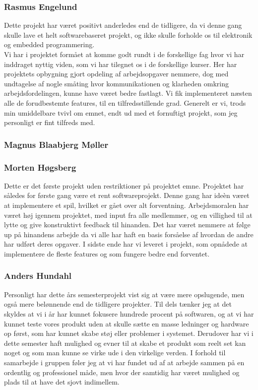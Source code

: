 \subsubsection{Rasmus Engelund}
Dette projekt har været positivt anderledes end de tidligere, da vi denne gang skulle lave et helt softwarebaseret projekt, og ikke skulle forholde os til elektronik og embedded programmering.\\
Vi har i projektet formået at komme godt rundt i de forskellige fag hvor vi har inddraget nyttig viden, som vi har tilegnet os i de forskellige kurser. Her har projektets opbygning gjort opdeling af arbejdsopgaver nemmere, dog med undtagelse af nogle småting hvor kommunikationen og klarheden omkring arbejdsfordelingen, kunne have været bedre fastlagt.
Vi fik implementeret næsten alle de forudbestemte features, til en tilfredsstillende grad.
Generelt er vi, trods min umiddelbare tvivl om emnet, endt ud med et fornuftigt projekt, som jeg personligt er fint tilfreds med. 

\subsubsection{Magnus Blaabjerg Møller}

\subsubsection{Morten Høgsberg}
Dette er det første projekt uden restriktioner på projektet emne. Projektet har således for første gang
være et rent softwareprojekt. Denne gang har ideèn været at implementere et spil, hvilket er gået over
alt forventning. Arbejdsmoralen har været høj igennem projektet, med input fra alle medlemmer, og en
villighed til at lytte og give konstruktivt feedback til hinanden.
Det har været nemmere at følge up på hinandens arbejde da vi alle har haft en basis forsåelse af hvordan 
de andre har udført deres opgaver. I sidste ende har vi leveret i projekt, som opnådede at implementere
de fleste features og som fungere bedre end forventet. 

\subsubsection{Anders Hundahl}
Personligt har dette års semesterprojekt vist sig at være mere opslugende, men også mere belønnende end de tidligere projekter. Til dels tænker jeg at det skyldes at vi i år har kunnet fokusere hundrede procent på softwaren, og at vi har kunnet teste vores produkt uden at skulle sætte en masse ledninger og hardware op først, som har kunnet skabe støj eller problemer i systemet. Derudover har vi i dette semester haft mulighed og evner til at skabe et produkt som reelt set kan noget og som man kunne se virke ude i den virkelige verden. I forhold til samarbejde i gruppen føler jeg at vi har fundet ud af at arbejde sammen på en ordentlig og professionel måde, men hvor der samtidig har været mulighed og plads til at have det sjovt indimellem.